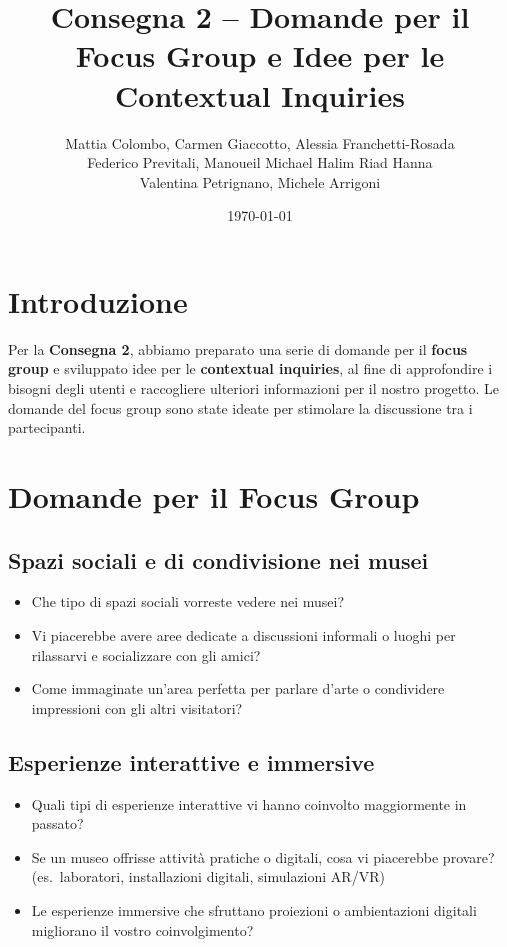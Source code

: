 \documentclass{article}
\title{Consegna 2 – Domande per il Focus Group e Idee per le Contextual Inquiries}
\author{Mattia Colombo, Carmen Giaccotto, Alessia Franchetti-Rosada \\Federico Previtali, Manoueil Michael Halim Riad Hanna \\ Valentina Petrignano, Michele Arrigoni}
\date{\today}
\begin{document}
\maketitle

\section*{Introduzione}

Per la \textbf{Consegna 2}, abbiamo preparato una serie di domande per il \textbf{focus group} e sviluppato idee per le \textbf{contextual inquiries}, al fine di approfondire i bisogni degli utenti e raccogliere ulteriori informazioni per il nostro progetto. Le domande del focus group sono state ideate per stimolare la discussione tra i partecipanti.

\section{Domande per il Focus Group}

\subsection{Spazi sociali e di condivisione nei musei}

\begin{itemize}
    \item Che tipo di spazi sociali vorreste vedere nei musei?
    \item Vi piacerebbe avere aree dedicate a discussioni informali o luoghi per rilassarvi e socializzare con gli amici?
    \item Come immaginate un’area perfetta per parlare d’arte o condividere impressioni con gli altri visitatori?
\end{itemize}

\subsection{Esperienze interattive e immersive}

\begin{itemize}
    \item Quali tipi di esperienze interattive vi hanno coinvolto maggiormente in passato?
    \item Se un museo offrisse attività pratiche o digitali, cosa vi piacerebbe provare? (es.\ laboratori, installazioni digitali, simulazioni AR/VR)
    \item Le esperienze immersive che sfruttano proiezioni o ambientazioni digitali migliorano il vostro coinvolgimento?
\end{itemize}
\end{document}
